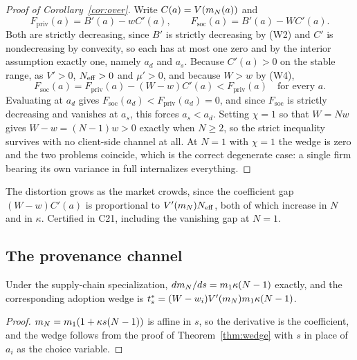 \begin{proof}[Proof of Corollary~\ref{cor:over}]
Write $C(a) = V(m_N(a))$ and
\[
  F_{\text{priv}}(a) = B'(a) - wC'(a), \qquad F_{\text{soc}}(a) = B'(a) - WC'(a).
\]
Both are strictly decreasing, since $B'$ is strictly decreasing by (W2) and $C'$ is nondecreasing by convexity, so each has at most one zero and by the interior assumption exactly one, namely $a_d$ and $a_s$. Because $C'(a) > 0$ on the stable range, as $V' > 0$, $N_{\mathrm{eff}} > 0$ and $\mu' > 0$, and because $W > w$ by (W4),
\[
  F_{\text{soc}}(a) = F_{\text{priv}}(a) - (W-w)C'(a) < F_{\text{priv}}(a) \quad \text{for every } a.
\]
Evaluating at $a_d$ gives $F_{\text{soc}}(a_d) < F_{\text{priv}}(a_d) = 0$, and since $F_{\text{soc}}$ is strictly decreasing and vanishes at $a_s$, this forces $a_s < a_d$. Setting $\chi = 1$ so that $W = Nw$ gives $W - w = (N-1)w > 0$ exactly when $N \geq 2$, so the strict inequality survives with no client-side channel at all. At $N=1$ with $\chi=1$ the wedge is zero and the two problems coincide, which is the correct degenerate case: a single firm bearing its own variance in full internalizes everything.
\end{proof}

The distortion grows as the market crowds, since the coefficient gap $(W-w)C'(a)$ is proportional to $V'(m_N)N_{\mathrm{eff}}$, both of which increase in $N$ and in $\kappa$. Certified in C21, including the vanishing gap at $N=1$.

\subsection{The provenance channel}

\begin{aproposition}
\label{aprop:prov}
Under the supply-chain specialization, $dm_N/ds = m_1\kappa(N-1)$ exactly, and the corresponding adoption wedge is $t^\ast_s = (W-w_i)V'(m_N)m_1\kappa(N-1)$.
\end{aproposition}

\begin{proof}
$m_N = m_1(1+\kappa s(N-1))$ is affine in $s$, so the derivative is the coefficient, and the wedge follows from the proof of Theorem~\ref{thm:wedge} with $s$ in place of $a_i$ as the choice variable.
\end{proof}

